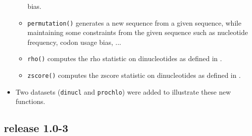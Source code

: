 \documentclass{article}
\begin{document}
\begin{itemize}
\begin{itemize}
      bias.
\item \texttt{permutation()} generates a new sequence from a given
  sequence, while maintaining some constraints from the given sequence
  such as nucleotide frequency, codon usage bias, ...
\item \texttt{rho()} computes the rho statistic on dinucleotides as
  defined in \cite{Karlin}.
\item \texttt{zscore()} computes the zscore statistic on dinucleotides
  as defined in \cite{UV}.
\end{itemize}
\item Two datasets (\texttt{dinucl} and \texttt{prochlo}) were added
  to illustrate these new functions.

\end{itemize}

\subsection{release 1.0-3}
\end{document}
